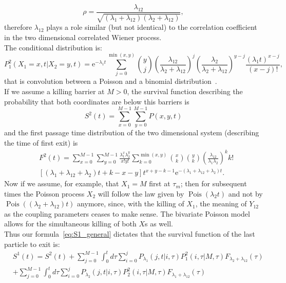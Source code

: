 \documentclass[a4paper,11pt]{amsart}
\theoremstyle{remark}
\newcommand{\ee}[1]{\mathrm{e}^{#1}}
\begin{document}
  \begin{equation}
    \rho=\frac{\lambda_{12}}{\sqrt{(\lambda_1+\lambda_{12})(\lambda_2+\lambda_{12})}},
  \end{equation}
  therefore $\lambda_{12}$ plays a role similar (but not identical) to the correlation coefficient in the two dimensional correlated Wiener process.\\
  The conditional distribution is:
  \begin{equation}
    P^2_1(X_1=x,t|X_2=y,t)=\ee{-\lambda_1t}\sum_{j=0}^{\min(x,y)}\binom{y}{j}\left(\frac{\lambda_{12}}{\lambda_2+\lambda_{12}}\right)^j\left(\frac{\lambda_{2}}{\lambda_2+\lambda_{12}}\right)^{y-j}\frac{(\lambda_1t)^{x-j}}{(x-j)!},
  \end{equation}
  that is convolution between a Poisson and a binomial distribution~\cite{kotz_discrete_2005}.\\
  If we assume a killing barrier at $M>0$, the survival function describing the probability that both coordinates are below this barriers is
  \begin{equation}
    \label{eq:survivalp2d_first}
    S^2(t)=\sum_{x=0}^{M-1}\sum_{y=0}^{M-1}P(x,y,t)
  \end{equation}
  and the first passage time distribution of the two dimensional system (describing the time of first exit) is
  \begin{equation}
    \label{eq:fpt_first}
    \begin{aligned}
      &F^2(t)=\sum_{x=0}^{M-1}\sum_{y=0}^{M-1}\frac{\lambda_1^x\lambda_2^y}{x! y!}\sum_{k=0}^{\min(x,y)}\binom{x}{k}\binom{y}{k}\left(\frac{\lambda_{12}}{\lambda_1\lambda_2}\right)^kk!\\
      &[(\lambda_{1} + \lambda_{12} + \lambda_{2}) t + k-x - y] t^{x+y-k-1} \ee{-(\lambda_{1}+\lambda_{12}+\lambda_{2})t}.
    \end{aligned}
  \end{equation}
  Now if we assume, for example, that $X_1=M$ first at $\tau_m$; then for subsequent times the Poisson process $X_2$ will follow the law given by $\operatorname{Pois}(\lambda_2 t)$ and not by $\operatorname{Pois}((\lambda_2+\lambda_{12})t)$ anymore, since, with the killing of $X_1$, the meaning of $Y_{12}$ as the coupling parameters ceases to make sense. The bivariate Poisson model allows for the simultaneous killing of both $X$s as well.\\
  Thus our formula~\eqref{eq:S1_general} dictates that the survival function of the last particle to exit is:
  \begin{equation}
    \label{eq:survivalp2d_last}
    \begin{aligned}
      &S^1(t)=S^2(t)+\sum_{j=0}^{M-1} \int_0^td\tau \sum_{i=0}^{j} P_{\lambda_1}(j,t|i,\tau)P^2_1(i,\tau|M,\tau)F_{\lambda_2+\lambda_{12}}(\tau)\\
      &+\sum_{j=0}^{M-1} \int_0^td\tau \sum_{i=0}^{j} P_{\lambda_2}(j,t|i,\tau)P^2_2(i,\tau|M,\tau)F_{\lambda_1+\lambda_{12}}(\tau)      
    \end{aligned}
  \end{equation}
\end{document}
